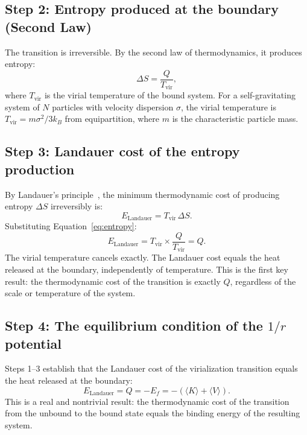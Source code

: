 \documentclass[12pt,a4paper]{article}
\begin{document}
\subsection{Step 2: Entropy produced at the boundary (Second Law)}

The transition is irreversible. By the second law of thermodynamics, it
produces entropy:
\begin{equation}
\Delta S = \frac{Q}{T_\mathrm{vir}},
\label{eq:entropy}
\end{equation}
where $T_\mathrm{vir}$ is the virial temperature of the bound system. For
a self-gravitating system of $N$ particles with velocity dispersion
$\sigma$, the virial temperature is $T_\mathrm{vir} = m\sigma^2/3k_B$
from equipartition, where $m$ is the characteristic particle mass.

\subsection{Step 3: Landauer cost of the entropy production}

By Landauer's principle~\citep{Landauer1961}, the minimum thermodynamic
cost of producing entropy $\Delta S$ irreversibly is:
\begin{equation}
E_\mathrm{Landauer} = T_\mathrm{vir}\,\Delta S.
\label{eq:landauer}
\end{equation}
Substituting Equation~\ref{eq:entropy}:
\begin{equation}
E_\mathrm{Landauer} = T_\mathrm{vir} \times \frac{Q}{T_\mathrm{vir}} = Q.
\label{eq:landauer2}
\end{equation}
The virial temperature cancels exactly. The Landauer cost equals the heat
released at the boundary, independently of temperature. This is the first
key result: the thermodynamic cost of the transition is exactly $Q$,
regardless of the scale or temperature of the system.

\subsection{Step 4: The equilibrium condition of the $1/r$ potential}

Steps 1--3 establish that the Landauer cost of the virialization
transition equals the heat released at the boundary:
\begin{equation}
E_\mathrm{Landauer} = Q = -E_f = -(\langle K \rangle + \langle V \rangle).
\label{eq:combined}
\end{equation}
This is a real and nontrivial result: the thermodynamic cost of the
transition from the unbound to the bound state equals the binding energy
of the resulting system.
\end{document}
